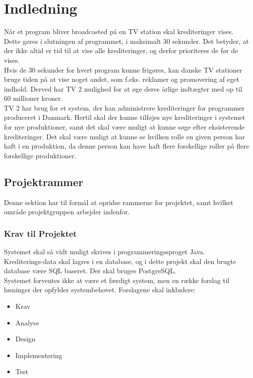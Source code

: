 \section{Indledning}
Når et program bliver broadcasted på en TV station skal krediteringer vises. Dette gøres i slutningen af programmet, i maksimalt 30 sekunder. Det betyder, at der ikke altid er tid til at vise alle krediteringer, og derfor prioriteres de før de vises. \\
Hvis de 30 sekunder for hvert program kunne frigøres, kan danske TV stationer bruge tiden på at vise noget andet, som f.eks. reklamer og promovering af eget indhold. Derved har TV 2 mulighed for at øge deres årlige indtægter med op til 60 millioner kroner. \\
TV 2 har brug for et system, der kan administrere krediteringer for programmer produceret i Danmark. Hertil skal der kunne tilføjes nye krediteringer i systemet for nye produktioner, samt det skal være muligt at kunne søge efter eksisterende krediteringer. Det skal være muligt at kunne se hvilken rolle en given person har haft i en produktion, da denne person kan have haft flere forskellige roller på flere forskellige produktioner.

\subsection{Projektrammer}
Denne sektion har til formål at opridse rammerne for projektet, samt hvilket område projektgruppen arbejder indenfor.

\subsubsection{Krav til Projektet}
Systemet skal så vidt muligt skrives i programmeringssproget Java. \\
Krediterings-data skal lagres i en database, og i dette projekt skal den brugte database være SQL baseret. Der skal bruges PostgreSQL.\\
Systemet forventes ikke at være et færdigt system, men en række forslag til løsninger der opfylder systembehovet. Forslagene skal inkludere:

\begin{itemize}
    \item Krav
    \item Analyse
    \item Design
    \item Implementering
    \item Test
\end{itemize}

